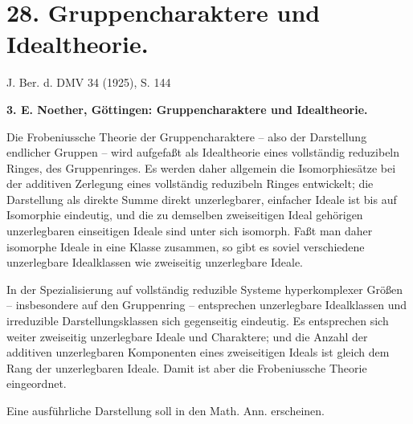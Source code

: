 \documentclass[11pt]{article}
\begin{document}
\section*{28. Gruppencharaktere und Idealtheorie.}

\begin{center}
J. Ber. d. DMV 34 (1925), S. 144
\end{center}

\textbf{3. E. Noether, Göttingen: Gruppencharaktere und Idealtheorie.}

Die Frobeniussche Theorie der Gruppencharaktere -- also der Darstellung endlicher Gruppen -- wird aufgefaßt als Idealtheorie eines vollständig reduzibeln Ringes, des Gruppenringes. Es werden daher allgemein die Isomorphiesätze bei der additiven Zerlegung eines vollständig reduzibeln Ringes entwickelt; die Darstellung als direkte Summe direkt unzerlegbarer, einfacher Ideale ist bis auf Isomorphie eindeutig, und die zu demselben zweiseitigen Ideal gehörigen unzerlegbaren einseitigen Ideale sind unter sich isomorph. Faßt man daher isomorphe Ideale in eine Klasse zusammen, so gibt es soviel verschiedene unzerlegbare Idealklassen wie zweiseitig unzerlegbare Ideale.

In der Spezialisierung auf vollständig reduzible Systeme hyperkomplexer Größen -- insbesondere auf den Gruppenring -- entsprechen unzerlegbare Idealklassen und irreduzible Darstellungsklassen sich gegenseitig eindeutig. Es entsprechen sich weiter zweiseitig unzerlegbare Ideale und Charaktere; und die Anzahl der additiven unzerlegbaren Komponenten eines zweiseitigen Ideals ist gleich dem Rang der unzerlegbaren Ideale. Damit ist aber die Frobeniussche Theorie eingeordnet.

Eine ausführliche Darstellung soll in den Math. Ann. erscheinen.
\end{document}
